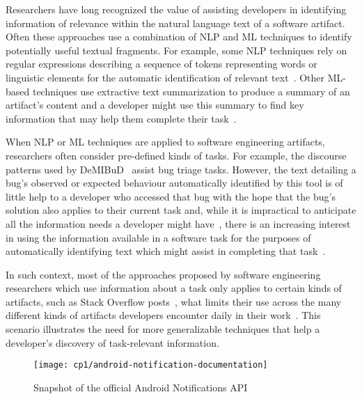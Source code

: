 



Researchers have long recognized the value of assisting developers in 
identifying information of relevance within the natural language
text of a software artifact. 
Often these approaches use a combination of \acf{NLP} and \acf{ML} techniques to identify potentially useful textual fragments. 
For example, some \acs{NLP} techniques rely on regular expressions describing a sequence of tokens
representing words or linguistic elements for the automatic identification 
of relevant text~\cite{Bavota2016, Chaparro2017}. 
Other \acs{ML}-based techniques use extractive text summarization 
to produce a summary of an artifact's content
and a developer might use this summary to find key information
that may help them complete their task~\cite{Bavota2016}.



When \acs{NLP} or \acs{ML} techniques are applied to software engineering artifacts, researchers often 
consider pre-defined kinds of tasks.
For example, the discourse patterns used by {\small DeMIBuD}~\cite{Chaparro2017} 
assist bug triage tasks. However, the text detailing a bug's observed or expected
behaviour automatically identified by this tool 
 is of little help to a developer who accessed that bug 
with the hope that the bug's solution also applies to their current task
and, while it is impractical to anticipate all the information needs a developer might have~\cite{sillito2006, josyula2018, ko2007}, there is an increasing interest in using the information 
available in a software task for the purposes of automatically identifying text 
which might assist in completing that task~\cite{Bavota2016}. 


In such context, most of the approaches proposed by software engineering researchers which 
use information about a task only applies to certain kinds of artifacts, such as Stack Overflow posts~\cite{Xu2017, silva2019}, what limits their use across the
many different kinds of artifacts developers encounter
daily in their work~\cite{Li2013}.
This scenario illustrates the need for more generalizable techniques that help a 
developer's discovery of task-relevant information.




\clearpage


\begin{landscape}
\begin{figure}
    \centering
    \texttt{[image: cp1/android-notification-documentation]}
    \caption{Snapshot of the official Android Notifications API}
    \label{fig:android-notifications-api-page}
\end{figure}

\end{landscape}

